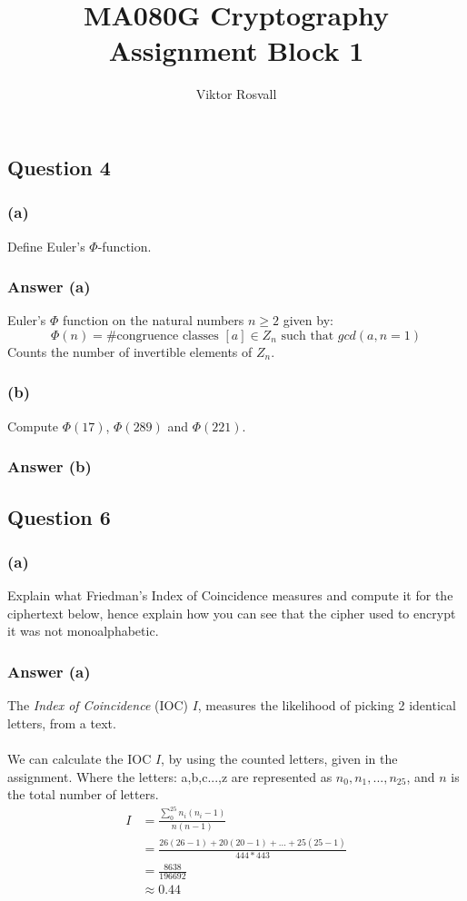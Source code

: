 \documentclass{article}
\title{MA080G Cryptography Assignment Block 1}
\author{Viktor Rosvall}
\begin{document}
	\maketitle
	
	\subsection*{Question 4}
	\subsubsection*{(a)}
	Define Euler’s $\Phi$-function.
	
	\subsubsection*{Answer (a)}
	Euler's $\Phi$ function on the natural numbers $n \geq 2$ given by:
	$$
	\Phi(n) =  \text{\# congruence classes } [a] \in Z_n \text{ such that }gcd(a,n = 1)
	$$
	Counts the number of invertible elements of $Z_n$. 
	
	\subsubsection*{(b)}
	Compute $\Phi(17)$, $\Phi(289)$ and $\Phi(221)$.
	
	\subsubsection*{Answer (b)}
	
	
	\subsection*{Question 6}
	\subsubsection*{(a)}
	Explain what Friedman’s Index of Coincidence measures and compute it for the
	ciphertext below, hence explain how you can see that the cipher used to encrypt
	it was not monoalphabetic.
	
	\subsubsection*{Answer (a)}
	The \textit{Index of Coincidence} (IOC) $I$, measures the likelihood of picking 2 identical letters, from a text. 
	\\\\
	We can calculate the IOC $I$, by using the counted letters, given in the assignment. Where the  letters: a,b,c...,z are represented as $n_0,n_1,...,n_{25}$, and $n$ is the total number of letters. 
	\[
	\begin{split}
	I &= \frac{\sum_{0}^{25}n_i(n_i-1)}{n(n-1)} \\
	&=\frac{26(26-1)+20(20-1)+...+25(25-1)}{444*443} \\
	&=\frac{8638}{196692} \\
	&\approx0.44
	\end{split}
	\]
	
\end{document}
